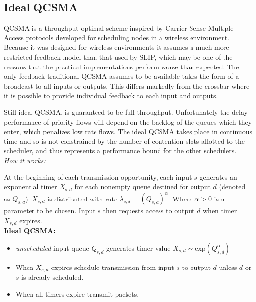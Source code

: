 \documentclass{IEEEtran}%
\begin{document}
\subsection{Ideal QCSMA}


QCSMA is a throughput optimal scheme inspired by Carrier Sense Multiple Access protocols developed for scheduling nodes in a wireless environment.  Because it was designed for wireless environments it assumes a much more restricted feedback model than that used by SLIP, which may be one of the reasons that the practical implementations perform worse than expected.  The only feedback traditional QCSMA assumes to be available takes the form of a broadcast to all inputs or outputs. This differs markedly from the crossbar where it is possible to provide individual feedback to each input and outputs.%

Still ideal QCSMA, is guaranteed to be full throughput.  Unfortunately the delay performance of priority flows will depend on the backlog of the queues which they enter, which penalizes low rate flows.  The ideal QCSMA takes place in continuous time and so is not constrained by the number of contention slots allotted to the scheduler, and thus represents a performance bound for the other schedulers.\\

{\it How it works:}

At the beginning of each transmission opportunity, each input $s$ generates an exponential timer $X_{s,d}$ for each nonempty queue  destined for output $d$ (denoted as $Q_{s,d}$).  $X_{s,d}$ is distributed with rate $\lambda_{s,d} = (Q_{s,d})^{\alpha}$.  Where $\alpha > 0$ is a parameter to be chosen.  Input $s$ then requests access to output $d$ when timer $X_{s,d}$ expires. \\ %

{\bf Ideal QCSMA:}
\begin{itemize}
\item {\it unscheduled} input queue $Q_{s,d}$ generates timer value $X_{s,d}\sim \text{exp}(Q_{s,d}^\alpha)$
\item When $X_{s,d}$ expires schedule transmission from input $s$ to output $d$ unless $d$ or $s$ is already scheduled.
\item When all timers expire transmit packets.\\
\end{itemize}
\end{document}

